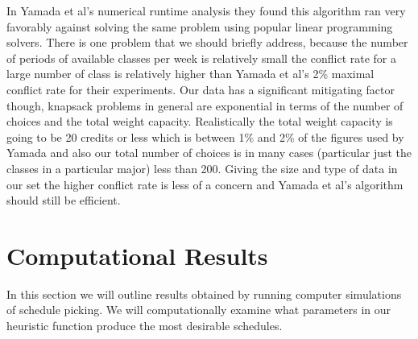 \documentclass[11pt]{article} %
\begin{document}
In Yamada et al’s \cite{yamada:heuristic} numerical runtime analysis they found this algorithm ran very favorably against solving the same problem using popular linear programming solvers. There is one problem that we should briefly address, because the number of periods of available classes per week is relatively small the conflict rate for a large number of class is relatively higher than Yamada et al’s 2\% maximal conflict rate for their experiments. Our data has a significant mitigating factor though, knapsack problems in general are exponential in terms of the number of choices and the total weight capacity. Realistically the total weight capacity is going to be 20 credits or less which is between 1\% and 2\% of the figures used by Yamada \cite{yamada:heuristic} and also our total number of choices is in many cases (particular just the classes in a particular major) less than 200. Giving the size and type of data in our set the higher conflict rate is less of a concern and Yamada et al’s algorithm should still be efficient.

\section{Computational Results}
In this section we will outline results obtained by running computer simulations of schedule picking. We will computationally examine what parameters in our heuristic function produce the most desirable schedules.

{}

\end{document}
